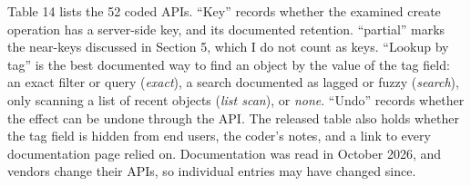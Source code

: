 \documentclass[
  10pt,
]{article}
\renewcommand{\arraystretch}{1.12}
\def\tablefont{\fontsize{8.5}{10.4}\selectfont}
\begin{document}
Table 14 lists the 52 coded APIs. ``Key'' records whether the examined
create operation has a server-side key, and its documented retention.
``partial'' marks the near-keys discussed in Section 5, which I do not
count as keys. ``Lookup by tag'' is the best documented way to find an
object by the value of the tag field: an exact filter or query
(\emph{exact}), a search documented as lagged or fuzzy (\emph{search}),
only scanning a list of recent objects (\emph{list scan}), or
\emph{none}. ``Undo'' records whether the effect can be undone through
the API. The released table also holds whether the tag field is hidden
from end users, the coder's notes, and a link to every documentation
page relied on. Documentation was read in October 2026, and vendors
change their APIs, so individual entries may have changed since.

\begingroup\def\tablefont{\fontsize{7.5}{9}\selectfont}\renewcommand{\arraystretch}{0.95}
\end{document}
